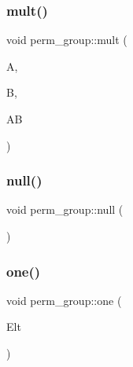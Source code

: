 \mbox{\label{classperm__group_aa36290ec8da34dd5c548e253089888c8}} 
\subsubsection{\texorpdfstring{mult()}{mult()}}
{\footnotesize\ttfamily void perm\+\_\+group\+::mult (\begin{DoxyParamCaption}\item[{\mbox{\hyperlink{galois_8h_a09fddde158a3a20bd2dcadb609de11dc}{I\+NT}} $\ast$}]{A,  }\item[{\mbox{\hyperlink{galois_8h_a09fddde158a3a20bd2dcadb609de11dc}{I\+NT}} $\ast$}]{B,  }\item[{\mbox{\hyperlink{galois_8h_a09fddde158a3a20bd2dcadb609de11dc}{I\+NT}} $\ast$}]{AB }\end{DoxyParamCaption})}

\mbox{\label{classperm__group_a0dd587ee6a789c607ed7a0c74b0f9f46}} 
\subsubsection{\texorpdfstring{null()}{null()}}
{\footnotesize\ttfamily void perm\+\_\+group\+::null (\begin{DoxyParamCaption}{ }\end{DoxyParamCaption})}

\mbox{\label{classperm__group_ab959c8e4c528c27dfc8d4ac1919681ee}} 
\subsubsection{\texorpdfstring{one()}{one()}}
{\footnotesize\ttfamily void perm\+\_\+group\+::one (\begin{DoxyParamCaption}\item[{\mbox{\hyperlink{galois_8h_a09fddde158a3a20bd2dcadb609de11dc}{I\+NT}} $\ast$}]{Elt }\end{DoxyParamCaption})}

\mbox{\label{classperm__group_a083e32b8e8d0851b42add30bf17e5a8a}} 
